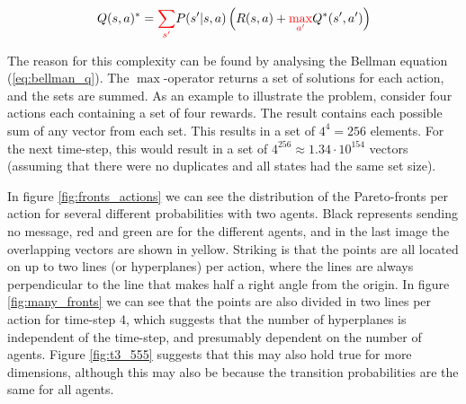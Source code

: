 \documentclass{article}
\begin{document}
\begin{multicols}{2}
	$$
	\displaystyle
	Q(s, a)^* = {\color{red}\sum_{s'}} P(s'|s, a) \left(R(s, a) + {\color{red}\max_{a'}} Q^*(s', a')\right)
	$$

	The reason for this complexity can be found by analysing the Bellman
	equation (\ref{eq:bellman_q}). The $\max$-operator returns a set of
	solutions for each action, and the sets are summed. As an example to
	illustrate the problem, consider four actions each containing a set of four
	rewards. The result contains each possible sum of any vector from each set.
	This results in a set of $4^4=256$ elements. For the next time-step, this
	would result in a set of $4^{256}\approx 1.34\cdot 10^{154}$ vectors
	(assuming that there were no duplicates and all states had the same set
	size).

	In figure \ref{fig:fronts_actions} we can see the distribution of the
	Pareto-fronts per action for several different probabilities with two
	agents. Black represents sending no message, red and green are for the
	different agents, and in the last image the overlapping vectors are shown in
	yellow. Striking is that the points are all located on up to two lines (or
	hyperplanes) per action, where the lines are always perpendicular to the
	line that makes half a right angle from the origin. In figure
	\ref{fig:many_fronts} we can see that the points are also divided in two
	lines per action for time-step 4, which suggests that the number of
	hyperplanes is independent of the time-step, and presumably dependent on the
	number of agents. Figure \ref{fig:t3_555} suggests that this may also hold
	true for more dimensions, although this may also be because the transition
	probabilities are the same for all agents.
	\end{multicols}
\end{document}
